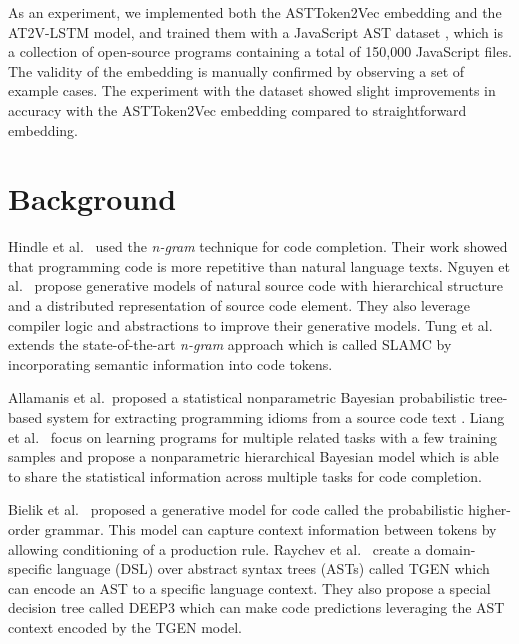 \documentclass[E]{compsoft}
\begin{document}
As an experiment, we implemented both the ASTToken2Vec embedding and the AT2V-LSTM model, and trained them with a JavaScript AST dataset \cite{dataset}, which is a  collection of open-source programs containing a total of 150,000 JavaScript files. 
The validity of the embedding is manually confirmed by observing a set of example cases.  The experiment with the dataset showed slight improvements in accuracy with the ASTToken2Vec embedding compared to straightforward embedding.




\section{Background}
Hindle et al.\  \cite{hindle2012naturalness} used the \textit{n-gram} technique for code completion.  Their work showed that programming code is more repetitive than natural language texts.
Nguyen et al.\  \cite{DBLP:journals/corr/MaddisonT14} propose generative models of natural source code with hierarchical structure and a distributed representation of source code element. 
They also leverage compiler logic and abstractions to improve their generative models.
Tung et al.\  \cite{Nguyen:2013:SSL:2491411.2491458} extends the state-of-the-art \textit{n-gram} approach which is called SLAMC by incorporating semantic information into code tokens. 

Allamanis et al.\ proposed a statistical nonparametric Bayesian probabilistic tree-based system for extracting programming idioms from a source code text
\cite{allamanis2014mining}.
Liang et al.\  \cite{liang2010learning} focus on learning programs for multiple related tasks with a few training samples and propose a nonparametric hierarchical Bayesian model which is able to share the statistical information across multiple tasks for code completion.

Bielik et al.\  \cite{bielik2016phog} proposed a generative model for code called the probabilistic higher-order grammar. This model can capture context information between tokens by allowing conditioning of a production rule. 
Raychev et al.\  \cite{raychev2016probabilistic} create a domain-specific language (DSL) over abstract syntax trees (ASTs) called TGEN which can encode an AST to a specific language context.
They also propose a special decision tree called DEEP3 which can make code predictions leveraging the AST context encoded by the TGEN model.
\end{document}

